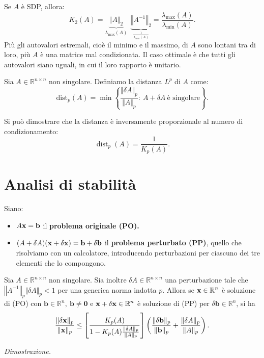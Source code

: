 Se $A$ è SDP, allora:
\begin{equation*}
K_{2}(A) =\underbrace{\Vert A\Vert _{2}}_{\lambda _{\text{max}}(A)} \ \ \underbrace{\left\Vert A^{-1}\right\Vert _{2}}_{\frac{1}{\lambda _{\text{min}}(A)}} =\frac{\lambda _{\text{max}}(A)}{\lambda _{\text{min}}(A)}.
\end{equation*}
Più gli autovalori estremali, cioè il minimo e il massimo, di $\displaystyle A$ sono lontani tra di loro, più $\displaystyle A$ è una matrice mal condizionata. Il caso ottimale è che tutti gli autovalori siano uguali, in cui il loro rapporto è unitario.
\begin{definition}[Distanza $L^p$]
Sia $\displaystyle A\in \mathbb{R}^{n\times n}$ non singolare. Definiamo la distanza $L^p$ di $A$ come:
\begin{equation*}
\text{dist}_{p}(A) =\min\left\{\frac{\Vert \delta A\Vert _{p}}{\Vert A\Vert _{p}} :\ A+\delta A\ \text{è singolare}\right\}.
\end{equation*}
\end{definition}
Si può dimostrare che la distanza è inversamente proporzionale al numero di condizionamento:
\begin{equation*}
\operatorname{dist}_{p}(A) =\frac{1}{K_{p}(A)}.
\end{equation*}
\section{Analisi di stabilità}

Siano:
\begin{itemize}
\item $\displaystyle A\mathbf{x} =\mathbf{b}$ il \textbf{problema originale (PO).}
\item $\displaystyle ( A+\delta A)(\mathbf{x} +\delta \mathbf{x}) =\mathbf{b} +\delta \mathbf{b}$ il \textbf{problema perturbato (PP)}, quello che risolviamo con un calcolatore, introducendo perturbazioni per ciascuno dei tre elementi che lo compongono.
\end{itemize}

\begin{theorem}
[stabilità]
Sia $\displaystyle A\in \mathbb{R}^{n\times n}$ non singolare. Sia inoltre $\displaystyle \delta A\in \mathbb{R}^{n\times n}$ una perturbazione tale che $\displaystyle \left\Vert A^{-1}\right\Vert _{p}\Vert \delta A\Vert _{p} < 1$ per una generica norma indotta $\displaystyle p$.
Allora se $\displaystyle \mathbf{x} \in \mathbb{R}^{n}$ è soluzione di (PO) con $\displaystyle \mathbf{b} \in \mathbb{R}^{n} ,\ \mathbf{b} \neq \mathbf{0}$ e $\displaystyle \mathbf{x} +\delta \mathbf{x} \in \mathbb{R}^{n}$ è soluzione di (PP) per $\displaystyle \delta \mathbf{b} \in \mathbb{R}^{n}$, si ha
\begin{equation*}
\frac{\Vert \delta \mathbf{x}\Vert _{p}}{\Vert \mathbf{x}\Vert _{p}} \leq \left[\frac{K_{p}(A)}{1-K_{p}(A)\frac{\Vert \delta A\Vert _{p}}{\Vert A\Vert _{p}}}\right]\left(\frac{\Vert \delta \mathbf{b}\Vert _{p}}{\Vert \mathbf{b}\Vert _{p}} +\frac{\Vert \delta A\Vert _{p}}{\Vert A\Vert _{p}}\right).
\end{equation*}
\label{thm:teorema-di-stabilita}
\end{theorem}
\textit{Dimostrazione.}

